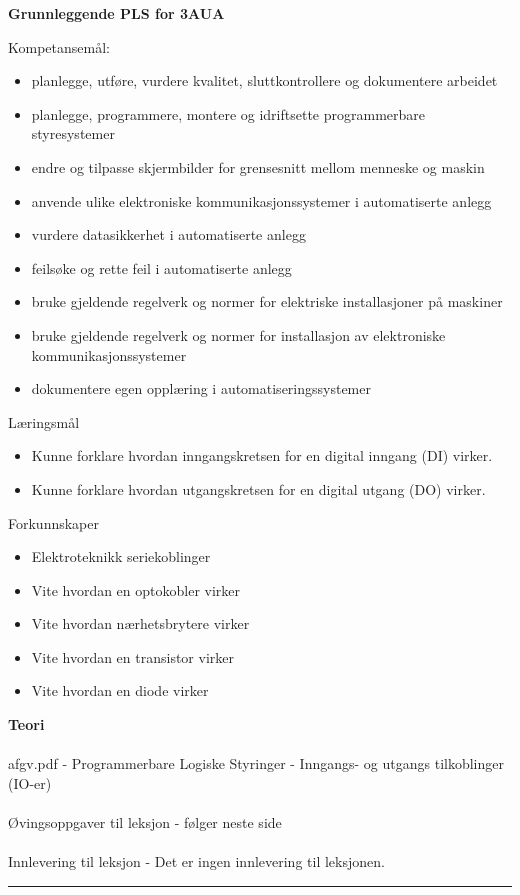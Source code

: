\centerline{\bf Grunnleggende PLS for 3AUA}  \bigskip

Kompetansemål:
\begin{itemize}[noitemsep]

	\item planlegge, utføre, vurdere kvalitet, sluttkontrollere og dokumentere arbeidet
	\item planlegge, programmere, montere og idriftsette programmerbare styresystemer
	\item endre og tilpasse skjermbilder for grensesnitt mellom menneske og maskin
	\item anvende ulike elektroniske kommunikasjonssystemer i automatiserte anlegg
	\item vurdere datasikkerhet i automatiserte anlegg
	\item feilsøke og rette feil i automatiserte anlegg
	\item bruke gjeldende regelverk og normer for elektriske installasjoner på maskiner
	\item bruke gjeldende regelverk og normer for installasjon av elektroniske kommunikasjonssystemer
	\item dokumentere egen opplæring i automatiseringssystemer
\end{itemize}
	Læringsmål
	\begin{itemize}[noitemsep]
		\item Kunne forklare hvordan inngangskretsen for en digital inngang (DI) virker. 
		\item Kunne forklare hvordan utgangskretsen for en digital utgang (DO) virker. 
	\end{itemize}

	Forkunnskaper

	\begin{itemize}[noitemsep]
		\item Elektroteknikk seriekoblinger
		\item Vite hvordan en optokobler virker
		\item Vite hvordan nærhetsbrytere virker
		\item Vite hvordan en transistor virker
		\item Vite hvordan en diode virker

	\end{itemize}
\textbf{Teori}\\\\
afgv.pdf - Programmerbare Logiske Styringer - Inngangs- og utgangs tilkoblinger (IO-er)\\\\
Øvingsoppgaver til leksjon - følger neste side\\\\
Innlevering til leksjon - Det er ingen innlevering til leksjonen. 
\bigskip 
\hrule
\vfil \eject

